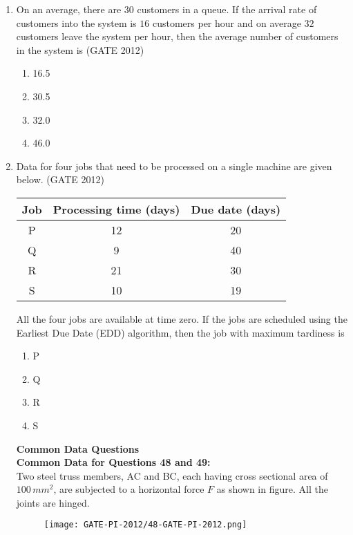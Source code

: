 \documentclass[journal,12pt,onecolumn]{IEEEtran}
\theoremstyle{remark}
\begin{document}
\begin{enumerate}
\item On an average, there are $30$ customers in a queue. 
If the arrival rate of customers into the system is $16$ customers per hour and on average $32$ customers leave the system per hour, then the average number of customers in the system is  
\hfill{(GATE 2012)}

\begin{enumerate}
\item 16.5
\item 30.5
\item 32.0
\item 46.0
\end{enumerate}
\vspace{1cm}

\item Data for four jobs that need to be processed on a single machine are given below. 
\hfill{(GATE 2012)}

\begin{tabular}{|c|c|c|}
\hline
Job & Processing time (days) & Due date (days) \\
\hline
P & 12 & 20 \\
Q & 9 & 40 \\
R & 21 & 30 \\
S & 10 & 19 \\
\hline
\end{tabular}


All the four jobs are available at time zero. If the jobs are scheduled using the Earliest Due Date (EDD) algorithm, then the job with maximum tardiness is  

\begin{enumerate}
\item P
\item Q
\item R
\item S
\end{enumerate}
\vspace{1cm}
\textbf{Common Data Questions }\\
\textbf{Common Data for Questions 48 and 49:   }\\
Two steel truss members, AC and BC, each having cross sectional area of $100 \, mm^2$, 
are subjected to a horizontal force $F$ as shown in figure. All the joints are hinged.  

\begin{figure}[h]
\centering
\texttt{[image: GATE-PI-2012/48-GATE-PI-2012.png]} 
\caption{}
\label{}
\end{figure}


\end{enumerate}
\end{document}
